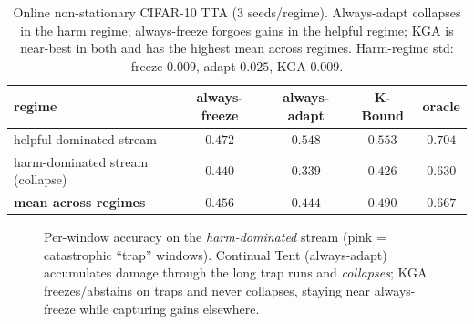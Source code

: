 \documentclass[conference]{IEEEtran}
\theoremstyle{plain}
\theoremstyle{definition}
\begin{document}
\begin{table}[t]\centering\small
\begin{tabular}{lcccc}
\toprule
regime & always-freeze & always-adapt & \textbf{K-Bound} & oracle \\
\midrule
helpful-dominated stream & $0.472$ & $0.548$ & $\mathbf{0.553}$ & $0.704$ \\
harm-dominated stream (collapse) & $0.440$ & $0.339$ & $0.426$ & $0.630$ \\
\midrule
\textbf{mean across regimes} & $0.456$ & $0.444$ & $\mathbf{0.490}$ & $0.667$ \\
\bottomrule
\end{tabular}
\caption{Online non-stationary CIFAR-10 TTA ($3$ seeds/regime). Always-adapt collapses in
the harm regime; always-freeze forgoes gains in the helpful regime; \textsc{KGA} is
near-best in both and has the highest mean across regimes. Harm-regime std: freeze
$0.009$, adapt $0.025$, KGA $0.009$.}
\label{tab:online}
\end{table}

\begin{figure}[tb]\centering
{}
\caption{Per-window accuracy on the \emph{harm-dominated} stream (pink = catastrophic
``trap'' windows). Continual Tent (always-adapt) accumulates damage through the long trap
runs and \emph{collapses}; \textsc{KGA} freezes/abstains on traps and never collapses,
staying near always-freeze while capturing gains elsewhere.}
\label{fig:online}
\end{figure}
\end{document}
